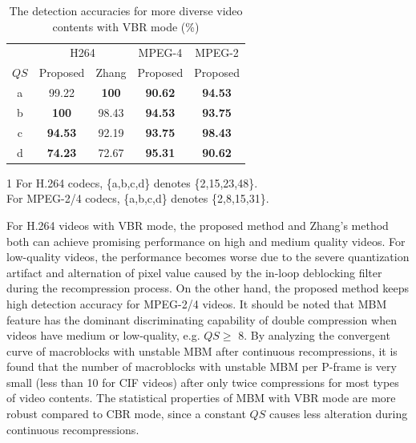 \documentclass[journal,sort]{IEEEtran}
\begin{document}
\begin{table}[!htb]
	\centering
	\caption{The detection accuracies for more diverse video contents with VBR mode (\%)}
	\begin{tabular}{ccccc}
		\toprule
		& \multicolumn{2}{c}{H264} & MPEG-4 & MPEG-2 \\
		\cmidrule(r){2-3}\cmidrule(r){4-4}\cmidrule(r){5-5}
		\multicolumn{1}{l}{$QS$\tnote{1}} & Proposed & Zhang & Proposed & Proposed \\
		\midrule
		a     & 99.22 & \textbf{100}   & \textbf{90.62} & \textbf{94.53} \\
		b     & \textbf{100} & 98.43 & \textbf{94.53} & \textbf{93.75} \\
		c     & \textbf{94.53} & 92.19 & \textbf{93.75} & \textbf{98.43} \\
		d     & \textbf{74.23} & 72.67 & \textbf{95.31} & \textbf{90.62} \\
		\bottomrule
	\end{tabular}%
	\begin{tablenotes}
		\footnotesize
		\item[1] For H.264 codecs, \{a,b,c,d\} denotes \{2,15,23,48\}.\\ For MPEG-2/4 codecs, \{a,b,c,d\} denotes \{2,8,15,31\}.
	\end{tablenotes}
	\label{tab:part2-vbr}%
\end{table}%

For H.264 videos with VBR mode, the proposed method and Zhang's method both can achieve promising performance on high and medium quality videos. For low-quality videos, the performance becomes worse due to the severe quantization artifact and alternation of pixel value caused by the in-loop deblocking filter during the recompression process. On the other hand, the proposed method keeps high detection accuracy for MPEG-2/4 videos. It should be noted that MBM feature has the dominant discriminating capability of double compression when videos have medium or low-quality, e.g. $QS \geq$ 8. By analyzing the convergent curve of macroblocks with unstable MBM after continuous recompressions, it is found that the number of macroblocks with unstable MBM per P-frame is very small (less than 10 for CIF videos) after only twice compressions for most types of video contents. The statistical properties of MBM with VBR mode are more robust compared to CBR mode, since a constant $QS$ causes less alteration during continuous recompressions. 
\end{document}
